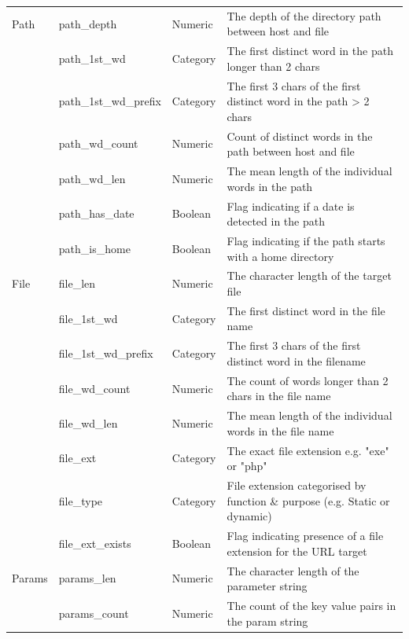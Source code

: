 \documentclass[sigconf]{acmart}
\begin{document}
\begin{table}
\begin{tabular}{|l|l|l|l|}
\midrule
Path          &path\_depth            &Numeric     &The depth of the directory path between host and file   \\
              &path\_1st\_wd          &Category    &The first distinct word in the path longer than 2 chars  \\
              &path\_1st\_wd\_prefix  &Category    &The first 3 chars of the first distinct word in the path > 2 chars   \\
              &path\_wd\_count        &Numeric     &Count of distinct words in the path between host and file   \\
              &path\_wd\_len          &Numeric     &The mean length of the individual words in the path  \\
              &path\_has\_date        &Boolean     &Flag indicating if a date is detected in the path  \\
              &path\_is\_home         &Boolean     &Flag indicating if the path starts with a home directory    \\
\midrule 
File          &file\_len              &Numeric     &The character length of the target file    \\
              &file\_1st\_wd          &Category    &The first distinct word in the file name  \\
              &file\_1st\_wd\_prefix  &Category    &The first 3 chars of the first distinct word in the filename  \\
              &file\_wd\_count        &Numeric     &The count of words longer than 2 chars in the file name   \\
              &file\_wd\_len          &Numeric     &The mean length of the individual words in the file name  \\
              &file\_ext              &Category    &The exact file extension e.g. "exe" or "php"    \\
              &file\_type             &Category    &File extension categorised by function \& purpose (e.g. Static or dynamic)   \\
              &file\_ext\_exists      &Boolean     &Flag indicating presence of a file extension for the URL target  \\
\midrule
Params        &params\_len            &Numeric     &The character length of the parameter string    \\
              &params\_count          &Numeric     &The count of the key value pairs in the param string    \\

\end{tabular}
\end{table}
\end{document}
